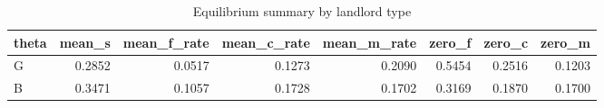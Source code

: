 \begin{table}

\caption{Equilibrium summary by landlord type}
\centering
\begin{tabular}[t]{lrrrrrrr}
\toprule
theta & mean\_s & mean\_f\_rate & mean\_c\_rate & mean\_m\_rate & zero\_f & zero\_c & zero\_m\\
\midrule
G & 0.2852 & 0.0517 & 0.1273 & 0.2090 & 0.5454 & 0.2516 & 0.1203\\
B & 0.3471 & 0.1057 & 0.1728 & 0.1702 & 0.3169 & 0.1870 & 0.1700\\
\bottomrule
\end{tabular}
\end{table}
